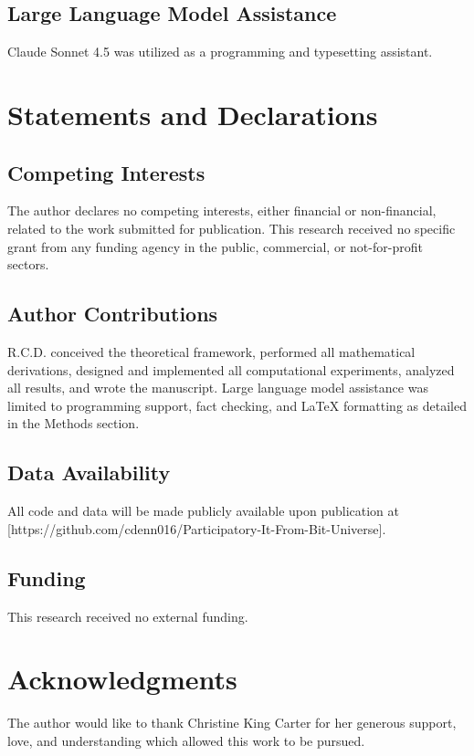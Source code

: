 \documentclass[11pt]{article}
\newenvironment{acknowledgments}
  {\section*{Acknowledgments}}
  {}
\begin{document}
\subsection{Large Language Model Assistance}
Claude Sonnet 4.5 was utilized as a programming and typesetting assistant.


\section*{Statements and Declarations}

\subsection*{Competing Interests}
The author declares no competing interests, either financial or non-financial, related to the work submitted for publication. This research received no specific grant from any funding agency in the public, commercial, or not-for-profit sectors.

\subsection*{Author Contributions}
R.C.D. conceived the theoretical framework, performed all mathematical derivations, designed and implemented all computational experiments, analyzed all results, and wrote the manuscript. Large language model assistance was limited to programming support, fact checking, and LaTeX formatting as detailed in the Methods section.

\subsection*{Data Availability}
All code and data will be made publicly available upon publication at [https://github.com/cdenn016/Participatory-It-From-Bit-Universe].

\subsection*{Funding}
This research received no external funding.

\begin{acknowledgments}
The author would like to thank Christine King Carter for her generous support, love, and understanding which allowed this work to be pursued.
\end{acknowledgments}

\appendix
\end{document}
